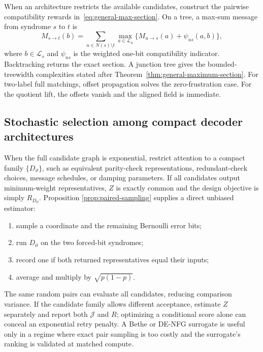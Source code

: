 \documentclass[journal]{IEEEtran}
\theoremstyle{definition}
\theoremstyle{remark}
\begin{document}
When an architecture restricts the available candidates, construct the
pairwise compatibility rewards in~\eqref{eq:general-max-section}.  On a tree,
a max-sum message from syndrome
$s$ to $t$ is
\begin{equation}
 M_{s\to t}(b)=
 \sum_{u\in N(s)\setminus t}
 \max_{a\in\mathcal L_u}
 \{M_{u\to s}(a)+\psi_{us}(a,b)\},
 \label{eq:maxsum}
\end{equation}
where $b\in\mathcal L_s$ and $\psi_{us}$ is the weighted one-bit
compatibility indicator.  Backtracking returns the exact section.  A junction
tree gives the bounded-treewidth complexities stated after
Theorem~\ref{thm:general-maximum-section}.  For two-label full matchings,
offset propagation solves the zero-frustration case.  For the quotient lift,
the offsets vanish and the aligned field is immediate.

\subsection{Stochastic selection among compact decoder architectures}

When the full candidate graph is exponential, restrict attention to a compact
family $\{D_\vartheta\}$, such as equivalent parity-check representations,
redundant-check choices, message schedules, or damping parameters.  If all
candidates output minimum-weight representatives, $Z$ is exactly common and
the design objective is simply $R_{D_\vartheta}$.  Proposition
\ref{prop:paired-sampling} supplies a direct unbiased estimator:

\begin{enumerate}
\item sample a coordinate and the remaining Bernoulli error bits;
\item run $D_\vartheta$ on the two forced-bit syndromes;
\item record one if both returned representatives equal their inputs;
\item average and multiply by $\sqrt{p(1-p)}$.
\end{enumerate}

The same random pairs can evaluate all candidates, reducing comparison
variance.  If the candidate family allows different acceptance, estimate $Z$
separately and report both $\mathcal J$ and $R$; optimizing a conditional score
alone can conceal an exponential retry penalty.  A Bethe or DE-NFG surrogate
is useful only in a regime where exact pair sampling is too costly and the
surrogate's ranking is validated at matched compute.
\end{document}
